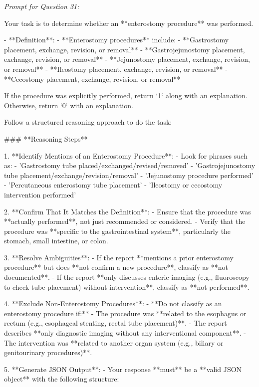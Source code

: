 \textit{\normalsize Prompt for Question  31:}
\begin{mdframed}[]
\normalsize

Your task is to determine whether an **enterostomy procedure** was performed.  

- **Definition**:  
  - **Enterostomy procedures** include:  
    - **Gastrostomy placement, exchange, revision, or removal**  
    - **Gastrojejunostomy placement, exchange, revision, or removal**  
    - **Jejunostomy placement, exchange, revision, or removal**  
    - **Ileostomy placement, exchange, revision, or removal**  
    - **Cecostomy placement, exchange, revision, or removal**  

If the procedure was explicitly performed, return `1` along with an explanation. Otherwise, return `0` with an explanation.

Follow a structured reasoning approach to do the task:

### **Reasoning Steps**  

1. **Identify Mentions of an Enterostomy Procedure**:  
   - Look for phrases such as:  
     - 'Gastrostomy tube placed/exchanged/revised/removed'  
     - 'Gastrojejunostomy tube placement/exchange/revision/removal'  
     - 'Jejunostomy procedure performed'  
     - 'Percutaneous enterostomy tube placement'  
     - 'Ileostomy or cecostomy intervention performed'  

2. **Confirm That It Matches the Definition**:  
   - Ensure that the procedure was **actually performed**, not just recommended or considered.  
   - Verify that the procedure was **specific to the gastrointestinal system**, particularly the stomach, small intestine, or colon.  

3. **Resolve Ambiguities**:  
   - If the report **mentions a prior enterostomy procedure** but does **not confirm a new procedure**, classify as **not documented**.  
   - If the report **only discusses enteric imaging (e.g., fluoroscopy to check tube placement) without intervention**, classify as **not performed**.  

4. **Exclude Non-Enterostomy Procedures**:  
   - **Do not classify as an enterostomy procedure if:**  
     - The procedure was **related to the esophagus or rectum (e.g., esophageal stenting, rectal tube placement)**.  
     - The report describes **only diagnostic imaging without any interventional component**.  
     - The intervention was **related to another organ system (e.g., biliary or genitourinary procedures)**.  

5. **Generate JSON Output**:  
   - Your response **must** be a **valid JSON object** with the following structure:  

\end{mdframed}

